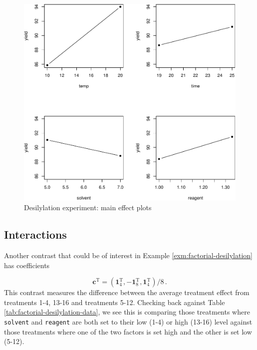 \documentclass[
]{book}
\theoremstyle{definition}
\theoremstyle{definition}
\theoremstyle{definition}
\theoremstyle{definition}
\theoremstyle{remark}
\begin{document}
\begin{figure}

{\centering \includegraphics{bookdown_math3014-6027_files/figure-latex/desilylation-me-plots-1} 

}

\caption{Desilylation experiment: main effect plots}\label{fig:desilylation-me-plots}
\end{figure}

\hypertarget{interactions}{%
\subsection{Interactions}\label{interactions}}

Another contrast that could be of interest in Example \ref{exm:factorial-desilylation} has coefficients

\[
\boldsymbol{c}^{\mathrm{T}} = (\boldsymbol{1}_4^{\mathrm{T}}, -\boldsymbol{1}_8^{\mathrm{T}}, \boldsymbol{1}_4^{\mathrm{T}}) / 8\,.
\]
This contrast measures the difference between the average treatment effect from treatments 1-4, 13-16 and treatments 5-12. Checking back against Table \ref{tab:factorial-desilylation-data}, we see this is comparing those treatments where \texttt{solvent} and \texttt{reagent} are both set to their low (1-4) or high (13-16) level against those treatments where one of the two factors is set high and the other is set low (5-12).
\end{document}
